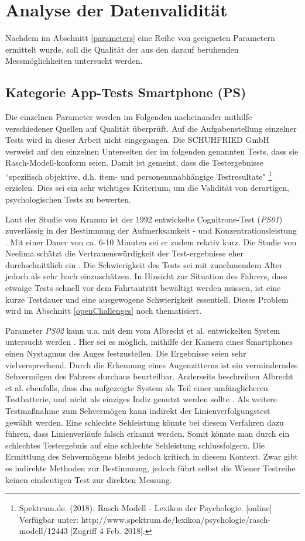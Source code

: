 \section{Analyse der Datenvalidität}
\label{dataValidity}
Nachdem im Abschnitt \ref{parameters} eine Reihe von geeigneten Parametern ermittelt wurde, soll die Qualität der aus den darauf beruhenden Messmöglichkeiten untersucht werden.

\subsection{Kategorie App-Tests Smartphone (PS)}

Die einzelnen Parameter werden im Folgenden nacheinander mithilfe verschiedener Quellen auf Qualität überprüft. Auf die Aufgabenstellung einzelner Tests wird in dieser Arbeit nicht eingegangen. Die SCHUHFRIED GmbH verweist auf den einzelnen Unterseiten der im folgenden genannten Tests, dass sie Rasch-Modell-konform seien. Damit ist gemeint, dass die Testergebnisse ``spezifisch objektive, d.h. item- und personenunabhängige Testresultate" \footnote{Spektrum.de. (2018). Rasch-Modell - Lexikon der Psychologie. [online] Verfügbar unter: http://www.spektrum.de/lexikon/psychologie/rasch-modell/12443 [Zugriff 4 Feb. 2018].} erzielen. Dies sei ein sehr wichtiges Kriterium, um die Validität von derartigen, psychologischen Tests zu bewerten.

Laut der Studie von Kramm ist der 1992 entwickelte Cognitrone-Test (\textit{PS01}) zuverlässig in der Bestimmung der Aufmerksamkeit - und Konzentrationsleistung \cite{studieaufmerksamkeitstests}. Mit einer Dauer von ca. 6-10 Minuten sei er zudem relativ kurz. Die Studie von Neelima schätzt die Vertrauenswürdigkeit der Test-ergebnisse eher durchschnittlich ein \cite{indiaassessment}. Die Schwierigkeit des Tests sei mit zunehmendem Alter jedoch als sehr hoch einzuschätzen. In Hinsicht zur Situation des Fahrers, dass etwaige Tests schnell vor dem Fahrtantritt bewältigt werden müssen, ist eine kurze Testdauer und eine ausgewogene Schwierigkeit essentiell. Dieses Problem wird im Abschnitt \ref{openChallenges} noch thematisiert.

Parameter \textit{PS02} kann u.a. mit dem vom Albrecht et al. entwickelten System untersucht werden \cite{mobilesmarttracking}. Hier sei es möglich, mithilfe der Kamera eines Smartphones einen Nystagmus des Auges festzustellen. Die Ergebnisse seien sehr vielversprechend. Durch die Erkennung eines Augenzitterns ist ein verminderndes Sehvermögen des Fahrers durchaus beurteilbar. Anderseits beschreiben Albrecht et al. ebenfalls, dass das aufgezeigte System als Teil einer umfänglicheren Testbatterie, und nicht als einziges Indiz genutzt werden sollte \cite{mobilesmarttracking}. Als weitere Testmaßnahme zum Sehvermögen kann indirekt der Linienverfolgungstest gewählt werden. Eine schlechte Sehleistung könnte bei diesem Verfahren dazu führen, dass Linienverläufe falsch erkannt werden. Somit könnte man durch ein schlechtes Testergebnis auf eine schlechte Sehleistung schlussfolgern. Die Ermittlung des Sehvermögens bleibt jedoch kritisch in diesem Kontext. Zwar gibt es indirekte Methoden zur Bestimmung, jedoch führt selbst die Wiener Testreihe keinen eindeutigen Test zur direkten Messung.

